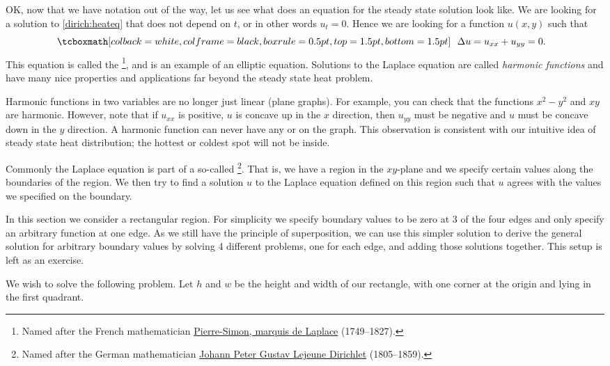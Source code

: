 OK\@, now that we have notation out of the way, let us see what does an equation
for the steady state solution look like.  We are looking for a solution to
\eqref{dirich:heateq} that does not depend on $t$, or in other words $u_t =
0$.  Hence we are looking for a
function $u(x,y)$ such that
\begin{equation*}
\mybxbg{~~
\Delta u = 
u_{xx} + u_{yy} = 0 .
~~}
\end{equation*}
This equation is called the \emph{}%
\footnote{Named after the French mathematician
\href{https://en.wikipedia.org/wiki/Laplace}{Pierre-Simon, marquis de Laplace}
(1749--1827).}, and is an example of an elliptic equation.
Solutions to the Laplace equation
are called \emph{harmonic functions}
and have many nice properties and
applications far beyond the steady state heat problem.

Harmonic functions in two variables are no longer just linear (plane
graphs).  For example, you can check that the functions
$x^2-y^2$ and $xy$ are harmonic.  However, note that if $u_{xx}$ is positive, $u$ is concave
up in the $x$ direction, then $u_{yy}$ must be negative and $u$ must be
concave down in the $y$ direction.  A harmonic function can never
have any  or  on the graph.  This observation is
consistent with our intuitive idea of steady state heat distribution;
the hottest or coldest spot will not be inside.

Commonly the Laplace equation is part of a so-called
\emph{}%
\footnote{Named after the German mathematician
\href{https://en.wikipedia.org/wiki/Dirichlet}{Johann Peter Gustav Lejeune Dirichlet}
(1805--1859).}.
That
is, we have a region in the $xy$-plane and we specify certain values along
the boundaries of the region.  We then try to find a solution $u$ to the
Laplace equation defined on
this region such that $u$ agrees with the values we specified on the
boundary.

In this section we consider a rectangular region.  For simplicity
we specify boundary values to be zero at 3 of the four edges and only
specify an arbitrary function at one edge.  As we still have the
principle of superposition, we can use this simpler
solution to derive the general
solution for arbitrary boundary values by solving 4 different problems,
one for each edge, and adding those solutions together.
This setup is left as an exercise.

We wish to solve the following problem.  Let $h$ and $w$
be the height and width of our rectangle, with one corner at the origin and
lying in the first quadrant.

